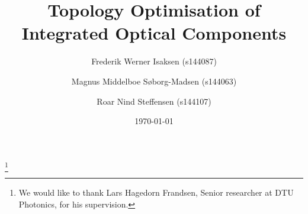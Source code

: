 \title{Topology Optimisation of Integrated Optical Components}
\author{Frederik Werner Isaksen (s144087)}
\author{Magnus Middelboe Søborg-Madsen (s144063)}
\author{Roar Nind Steffensen (s144107)}
\date{\today}
\thanks{We would like to thank Lars Hagedorn Frandsen, Senior researcher at DTU Photonics, for his supervision.}